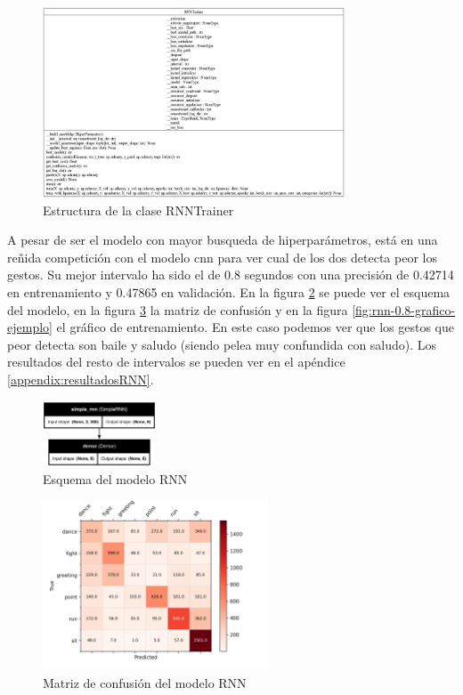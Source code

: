 \begin{figure}[h!]
    \centering
    \includegraphics[width=0.8\textwidth]{Imagenes/Bitmap/classes_RNNTrainer.png}
    \caption{Estructura de la clase RNNTrainer}
    \label{fig:rnn-estructura}
\end{figure}

A pesar de ser el modelo con mayor busqueda de hiperparámetros, está en una reñida competición con el modelo \gls{cnn} para ver cual de los dos detecta peor los gestos. Su mejor intervalo ha sido el de 0.8 segundos con una precisión de 0.42714 en entrenamiento y 0.47865 en validación. En la figura \ref{fig:rnn-0.8-ejemplo} se puede ver el esquema del modelo, en la figura \ref{fig:rnn-0.8-matriz-ejemplo} la matriz de confusión y en la figura \ref{fig:rnn-0.8-grafico-ejemplo} el gráfico de entrenamiento. En este caso podemos ver que los gestos que peor detecta son baile y saludo (siendo pelea muy confundida con saludo). Los resultados del resto de intervalos se pueden ver en el apéndice \ref{appendix:resultadosRNN}.

\begin{figure}[H]
    \centering
    \includegraphics[width=0.3\textwidth]{Imagenes/Bitmap/best-rnn0.8.png}
    \caption{Esquema del modelo RNN}
    \label{fig:rnn-0.8-ejemplo}
\end{figure}

\begin{figure}[H]
    \centering
    \includegraphics[width=0.6\textwidth]{Imagenes/Bitmap/CM_best-rnn0.8.png}
    \caption{Matriz de confusión del modelo RNN}
    \label{fig:rnn-0.8-matriz-ejemplo}
\end{figure}

